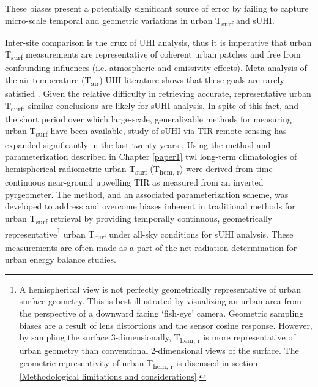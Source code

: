 \begin{bibunit}
\noindent These biases present a potentially significant source of error by failing to capture micro-scale temporal and geometric variations in urban T\textsubscript{surf} and sUHI. 

Inter-site comparison is the crux of UHI analysis, thus it is imperative that urban T\textsubscript{surf} measurements are representative of coherent urban patches and free from confounding influences (i.e. atmospheric and emissivity effects). Meta-analysis of the air temperature (T\textsubscript{air}) UHI literature shows that these goals are rarely satisfied \citep{Stewart2011}. Given the relative difficulty in retrieving accurate, representative urban T\textsubscript{surf}, similar conclusions are likely for sUHI analysis. In spite of this fact, and the short period over which large-scale, generalizable methods for measuring urban T\textsubscript{surf} have been available, study of sUHI via TIR remote sensing has expanded significantly in the last twenty years \citep{Peng2012,Voogt2003}. Using the method and parameterization described in Chapter \ref{paper1} twl long-term climatologies of hemispherical radiometric urban T\textsubscript{surf} (T\textsubscript{hem, r}) were derived from time continuous near-ground upwelling TIR as measured from an inverted pyrgeometer. The method, and an associated parameterization scheme, was developed to address and overcome biases inherent in traditional methods for urban T\textsubscript{surf} retrieval by providing temporally continuous, geometrically representative\footnote{A hemispherical view is not perfectly geometrically representative of urban surface geometry. This is best illustrated by visualizing an urban area from the perspective of a downward facing ‘fish-eye’ camera. Geometric sampling biases are a result of lens distortions and the sensor cosine response. However, by sampling the surface 3-dimensionally, T\textsubscript{hem, r} is more representative of urban geometry than conventional 2-dimensional views of the surface. The geometric representivity of urban T\textsubscript{hem, r} is discussed in section \ref{Methodological limitations and considerations}.} urban T\textsubscript{surf} under all-sky conditions for sUHI analysis. These measurements are often made as a part of the net radiation determination for urban energy balance studies.


\end{bibunit}
